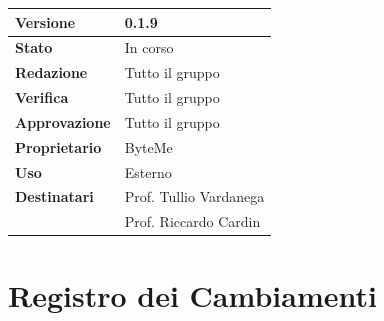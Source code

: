 \documentclass[11pt,a4paper]{article}
\begin{document}
\begin{titlepage}
    \begin{table}[H]
        \centering
        \begin{tabular}{|l|p{5cm}|}
            \hline
            \textbf{Versione} & 0.1.9 \\
            \hline
            \textbf{Stato} & In corso \\
            \hline
            \textbf{Redazione} & Tutto il gruppo \\
            \hline
            \textbf{Verifica} & Tutto il gruppo \\
            \hline
            \textbf{Approvazione} & Tutto il gruppo \\
            \hline
            \textbf{Proprietario} & ByteMe \\
            \hline
            \textbf{Uso} & Esterno \\
            \hline
            \textbf{Destinatari} & Prof. Tullio Vardanega \\ & Prof. Riccardo Cardin \\
            \hline
        \end{tabular}
    \end{table}
    
    \vfill
\end{titlepage}

\section*{Registro dei Cambiamenti}
\end{document}
